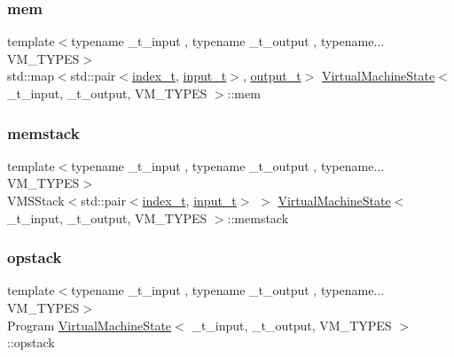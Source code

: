 \mbox{\label{class_virtual_machine_state_a8f36d4040b98a1e85fb7edf61e6085c9}} 
\subsubsection{\texorpdfstring{mem}{mem}}
{\footnotesize\ttfamily template$<$typename \+\_\+t\+\_\+input , typename \+\_\+t\+\_\+output , typename... V\+M\+\_\+\+T\+Y\+P\+ES$>$ \\
std\+::map$<$std\+::pair$<$\hyperlink{class_virtual_machine_state_a95ba2f54f65b778c8a012ea3e7a0ee50}{index\+\_\+t}, \hyperlink{class_virtual_machine_state_a04c5592dddd5b9ffdae5a509d73127dd}{input\+\_\+t}$>$, \hyperlink{class_virtual_machine_state_a005a025f97d9505b00e7f9f0e99002bb}{output\+\_\+t}$>$ \hyperlink{class_virtual_machine_state}{Virtual\+Machine\+State}$<$ \+\_\+t\+\_\+input, \+\_\+t\+\_\+output, V\+M\+\_\+\+T\+Y\+P\+ES $>$\+::mem}

\mbox{\label{class_virtual_machine_state_a27df19177ca8ede5d88bf51cff785c00}} 
\subsubsection{\texorpdfstring{memstack}{memstack}}
{\footnotesize\ttfamily template$<$typename \+\_\+t\+\_\+input , typename \+\_\+t\+\_\+output , typename... V\+M\+\_\+\+T\+Y\+P\+ES$>$ \\
V\+M\+S\+Stack$<$std\+::pair$<$\hyperlink{class_virtual_machine_state_a95ba2f54f65b778c8a012ea3e7a0ee50}{index\+\_\+t}, \hyperlink{class_virtual_machine_state_a04c5592dddd5b9ffdae5a509d73127dd}{input\+\_\+t}$>$ $>$ \hyperlink{class_virtual_machine_state}{Virtual\+Machine\+State}$<$ \+\_\+t\+\_\+input, \+\_\+t\+\_\+output, V\+M\+\_\+\+T\+Y\+P\+ES $>$\+::memstack}

\mbox{\label{class_virtual_machine_state_af154a184be7061c9fc1ee7fa875cffa0}} 
\subsubsection{\texorpdfstring{opstack}{opstack}}
{\footnotesize\ttfamily template$<$typename \+\_\+t\+\_\+input , typename \+\_\+t\+\_\+output , typename... V\+M\+\_\+\+T\+Y\+P\+ES$>$ \\
Program \hyperlink{class_virtual_machine_state}{Virtual\+Machine\+State}$<$ \+\_\+t\+\_\+input, \+\_\+t\+\_\+output, V\+M\+\_\+\+T\+Y\+P\+ES $>$\+::opstack}

